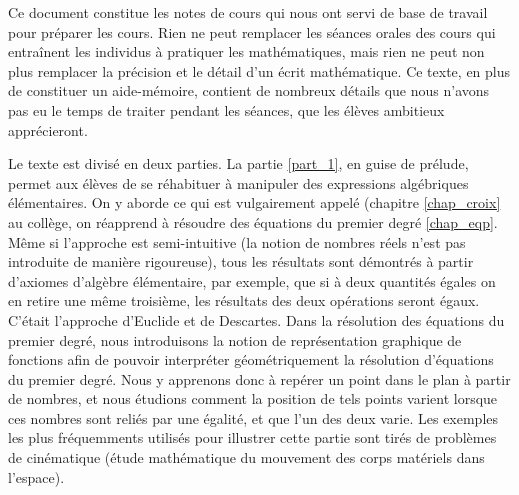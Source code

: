 Ce document constitue les notes de cours qui nous ont servi de base de travail pour préparer les cours. Rien ne peut remplacer les séances orales des cours qui entraînent les individus à pratiquer les mathématiques, mais rien ne peut non plus remplacer la précision et le détail d'un écrit mathématique. Ce texte, en plus de constituer un aide-mémoire, contient de nombreux détails que nous n'avons pas eu le temps de traiter pendant les séances, que les élèves ambitieux apprécieront.

Le texte est divisé en deux parties. La partie \ref{part_1}, en guise de prélude, permet aux élèves de se réhabituer à manipuler des expressions algébriques élémentaires. On y aborde ce qui est vulgairement appelé  (chapitre \ref{chap_croix} au collège, on réapprend à résoudre des équations du premier degré \ref{chap_eqp}. Même si l'approche est semi-intuitive (la notion de nombres réels n'est pas introduite de manière rigoureuse), tous les résultats sont démontrés à partir d'axiomes d'algèbre élémentaire, par exemple, que si à deux quantités égales on en retire une même troisième, les résultats des deux opérations seront égaux. C'était l'approche d'Euclide et de Descartes. Dans la résolution des équations du premier degré, nous introduisons la notion de représentation graphique de fonctions afin de pouvoir interpréter géométriquement la résolution d'équations du premier degré. Nous y apprenons donc à repérer un point dans le plan à partir de nombres, et nous étudions comment la position de tels points varient lorsque ces nombres sont reliés par une égalité, et que l'un des deux varie. Les exemples les plus fréquemments utilisés pour illustrer cette partie sont tirés de problèmes de cinématique (étude mathématique du mouvement des corps matériels dans l'espace). 

